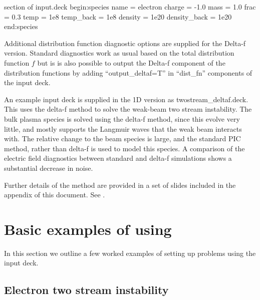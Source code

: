\begin{lboxverbatim}{section of input.deck}
begin:species
   name = electron
   charge = -1.0
   mass  = 1.0
   frac = 0.3
   temp = 1e8
   temp_back = 1e8
   density = 1e20
   density_back = 1e20
end:species
\end{lboxverbatim}

Additional distribution function diagnostic options are supplied for the
Delta-f version. Standard diagnostics work as usual based on the total
distribution function $f$ but is is also possible to output the Delta-f
component of the distribution functions by adding ``output\_deltaf=T'' in
``dist\_fn'' components of the input deck.

An example input deck is supplied in the 1D {\EPOCH} version as
twostream\_deltaf.deck. This uses the delta-f method to solve the weak-beam
two stream instability. The bulk plasma species is solved using the delta-f
method, since this evolve very little, and mostly supports the Langmuir waves
that the weak beam interacts with. The relative change to the beam species is
large, and the standard PIC method, rather than delta-f is used to model this
species. A comparison of the electric field diagnostics between standard and
delta-f simulations shows a substantial decrease in noise.

Further details of the method are provided in a set of slides included in the
appendix of this document. See .

\section{\texorpdfstring
  {Basic examples of using {\EPOCH}}
  {Basic examples of using {EPOCH}}}
\label{sec:examples}

In this section we outline a few worked examples of setting up problems
using the {\EPOCH} input deck.

\subsection{Electron two stream instability}

